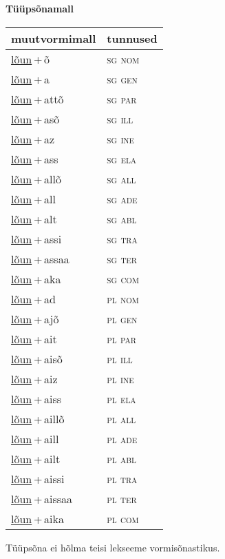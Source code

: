 
\vspace{1.8em}
\begin{minipage}{\textwidth}
\textbf{Tüüpsõnamall \,}\\

\begin{sideways}
\begin{tabular}{l l}
muutvormimall & tunnused \\
\hline
\underline{lõun}\,+\,õ & \textsc{ sg nom } \\
\underline{lõun}\,+\,a & \textsc{ sg gen } \\
\underline{lõun}\,+\,attõ & \textsc{ sg par } \\
\underline{lõun}\,+\,asõ & \textsc{ sg ill } \\
\underline{lõun}\,+\,az & \textsc{ sg ine } \\
\underline{lõun}\,+\,ass & \textsc{ sg ela } \\
\underline{lõun}\,+\,allõ & \textsc{ sg all } \\
\underline{lõun}\,+\,all & \textsc{ sg ade } \\
\underline{lõun}\,+\,alt & \textsc{ sg abl } \\
\underline{lõun}\,+\,assi & \textsc{ sg tra } \\
\underline{lõun}\,+\,assaa & \textsc{ sg ter } \\
\underline{lõun}\,+\,aka & \textsc{ sg com } \\
\underline{lõun}\,+\,ad & \textsc{ pl nom } \\
\underline{lõun}\,+\,ajõ & \textsc{ pl gen } \\
\underline{lõun}\,+\,ait & \textsc{ pl par } \\
\underline{lõun}\,+\,aisõ & \textsc{ pl ill } \\
\underline{lõun}\,+\,aiz & \textsc{ pl ine } \\
\underline{lõun}\,+\,aiss & \textsc{ pl ela } \\
\underline{lõun}\,+\,aillõ & \textsc{ pl all } \\
\underline{lõun}\,+\,aill & \textsc{ pl ade } \\
\underline{lõun}\,+\,ailt & \textsc{ pl abl } \\
\underline{lõun}\,+\,aissi & \textsc{ pl tra } \\
\underline{lõun}\,+\,aissaa & \textsc{ pl ter } \\
\underline{lõun}\,+\,aika & \textsc{ pl com } \\
\end{tabular}
\end{sideways}
\label{tab:tüüpsõnamall-lõunõ}

\end{minipage}

 
\vspace{1em}
\noindent Tüüpsõna ei hõlma teisi lekseeme vormi\-sõnastikus.
